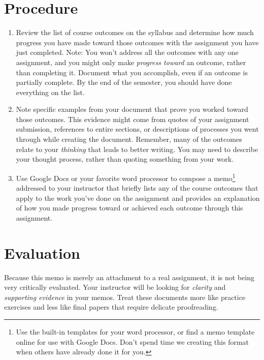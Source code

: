 \documentclass[11pt, oneside]{amsart}	%
\begin{document}
\section{Procedure} %
\label{sec:procedure}
\begin{enumerate}
	\item Review the list of course outcomes on the syllabus and determine how much progress you have made toward those outcomes with the assignment you have just completed. Note: You won't address all the outcomes with any one assignment, and you might only make \emph{progress toward} an outcome, rather than completing it. Document what you accomplish, even if an outcome is partially complete. By the end of the semester, you should have done everything on the list.
	\item Note specific examples from your document that prove you worked toward those outcomes. This evidence might come from quotes of your assignment submission, references to entire sections, or descriptions of processes you went through while creating the document. Remember, many of the outcomes relate to your \emph{thinking} that leads to better writing. You may need to describe your thought process, rather than quoting something from your work.
	\item Use Google Docs or your favorite word processor to compose a memo\footnote{Use the built-in templates for your word processor, or find a memo template online for use with Google Docs. Don't spend time we creating this format when others have already done it for you.} addressed to your instructor that briefly lists any of the course outcomes that apply to the work you've done on the assignment and provides an explanation of how you made progress toward or achieved each outcome through this assignment.
\end{enumerate}




\section{Evaluation} %
\label{sec:evaluation}
Because this memo is merely an attachment to a real assignment, it is not being very critically evaluated. Your instructor will be looking for \emph{clarity} and \emph{supporting evidence} in your memos. Treat these documents more like practice exercises and less like final papers that require delicate proofreading.
\end{document}
